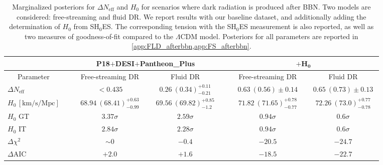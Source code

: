 \documentclass[aps,prd,twocolumn,notitlepage,
superscriptaddress,
nofootinbib,floatfix]{revtex4-2}
\newcommand{\planck}{\textbf{P18}}
\newcommand{\desi}{$\mathbf{+}$\textbf{DESI}}
\newcommand{\pantheon}{$\mathbf{+}${\bf Pantheon\_Plus}}
\newcommand{\shoes}{$\mathbf{+ H_0}$}
\begin{document}
\begin{table}

\begin{tabular} {| l |l| c| c|l| c| c|}
\hline\hline
 \multicolumn{1}{|c|}{}& &  \multicolumn{2}{|c|}{~~\planck\desi\pantheon~~} &&  \multicolumn{2}{|c|}{\shoes}\\
 \hline
 \multicolumn{1}{|c|}{ Parameter} & & \multicolumn{1}{|c|}{~~Free-streaming DR~~} &  \multicolumn{1}{|c|}{~~~~~Fluid DR~~~~~} & &  \multicolumn{1}{|c|}{~~Free-streaming DR~~} &  \multicolumn{1}{|c|}{~~~~~Fluid DR~~~~~}\\
\hline\hline
$\Delta N_{\mbox{eff}}$    && $ < 0.435$ & $0.26~(0.34)^{+0.11}_{-0.21}      $ & & $0.63~(0.56)\pm 0.14      $ & $0.65~(0.73)\pm 0.13      $\\
$H_0 \,[\mathrm{km}/\mathrm{s}/\mathrm{Mpc}]$ & &$68.94~(68.41)^{+0.63}_{-0.99}     $ & $69.56~(69.82)^{+0.85}_{-1.2}      $ & &$71.82~(71.65)^{+0.78}_{-0.77}     $ & $72.26~(73.0)^{+0.77}_{-0.78}     $\\
\hline
\hline
$H_0$ GT && $3.37\sigma $ & $2.59\sigma $ && $0.94\sigma $ & $0.6\sigma $\\
\hline
$H_0$ IT && $2.84\sigma $ & $2.28\sigma $ & &$0.94\sigma $ & $0.6\sigma $\\
\hline
$\Delta \chi^2$ & &$\sim 0$ & $-0.4$ && $-20.5$ & $-24.7$\\
\hline
$\Delta$AIC && $+2.0$ & $+1.6$ && $-18.5$ & $-22.7$\\
\hline
\end{tabular}

\caption{Marginalized posteriors for $\Delta N_\text{eff}$ and $H_0$ for scenarios where dark radiation is produced after BBN. Two models are considered: free-streaming and fluid DR. We report results with our baseline dataset, and additionally adding the determination of $H_0$ from SH$_0$ES. The corresponding tension with the SH$_0$ES measurement is also reported, as well as two measures of goodness-of-fit compared to the $\Lambda$CDM model. Posteriors for all parameters are reported in \cref{app:FLD_afterbbn,app:FS_afterbbn}.}
\label{tab:plusshoes}

\end{table}
\end{document}
